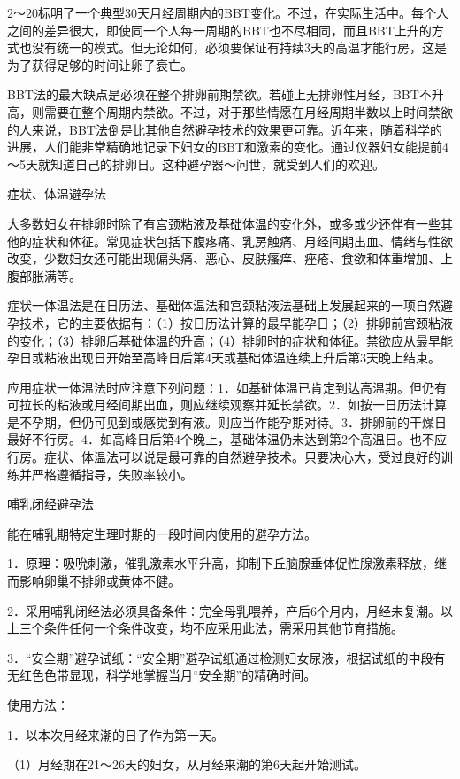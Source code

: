 \documentclass[12pt,UTF8,openany]{ctexbook}
\begin{document}
2～20标明了一个典型30天月经周期内的BBT变化。不过，在实际生活中。每个人之间的差异很大，即使同一个人每一周期的BBT也不尽相同，而且BBT上升的方式也没有统一的模式。但无论如何，必须要保证有持续3天的高温才能行房，这是为了获得足够的时间让卵子衰亡。

BBT法的最大缺点是必须在整个排卵前期禁欲。若碰上无排卵性月经，BBT不升高，则需要在整个周期内禁欲。不过，对于那些情愿在月经周期半数以上时间禁欲的人来说，BBT法倒是比其他自然避孕技术的效果更可靠。近年来，随着科学的进展，人们能非常精确地记录下妇女的BBT和激素的变化。通过仪器妇女能提前4～5天就知道自己的排卵日。这种避孕器～问世，就受到人们的欢迎。

症状、体温避孕法

大多数妇女在排卵时除了有宫颈粘液及基础体温的变化外，或多或少还伴有一些其他的症状和体征。常见症状包括下腹疼痛、乳房触痛、月经间期出血、情绪与性欲改变，少数妇女还可能出现偏头痛、恶心、皮肤瘙痒、痤疮、食欲和体重增加、上腹部胀满等。

症状一体温法是在日历法、基础体温法和宫颈粘液法基础上发展起来的一项自然避孕技术，它的主要依据有：（1）按日历法计算的最早能孕日；（2）排卵前宫颈粘液的变化；（3）排卵后基础体温的升高；（4）排卵时的症状和体征。禁欲应从最早能孕日或粘液出现日开始至高峰日后第4天或基础体温连续上升后第3天晚上结束。

应用症状一体温法时应注意下列问题：1．如基础体温已肯定到达高温期。但仍有可拉长的粘液或月经间期出血，则应继续观察并延长禁欲。2．如按一日历法计算是不孕期，但仍可见到或感觉到有液。则应当作能孕期对待。3．排卵前的干燥日最好不行房。4．如高峰日后第4个晚上，基础体温仍未达到第2个高温日。也不应行房。症状、体温法可以说是最可靠的自然避孕技术。只要决心大，受过良好的训练并严格遵循指导，失败率较小。





哺乳闭经避孕法


能在哺乳期特定生理时期的一段时间内使用的避孕方法。

1．原理：吸吮刺激，催乳激素水平升高，抑制下丘脑腺垂体促性腺激素释放，继而影响卵巢不排卵或黄体不健。

2．采用哺乳闭经法必须具备条件：完全母乳喂养，产后6个月内，月经未复潮。以上三个条件任何一个条件改变，均不应采用此法，需采用其他节育措施。

3．“安全期”避孕试纸：“安全期”避孕试纸通过检测妇女尿液，根据试纸的中段有无红色色带显现，科学地掌握当月“安全期”的精确时间。

使用方法：

1．以本次月经来潮的日子作为第一天。

（1）月经期在21～26天的妇女，从月经来潮的第6天起开始测试。
\end{document}
